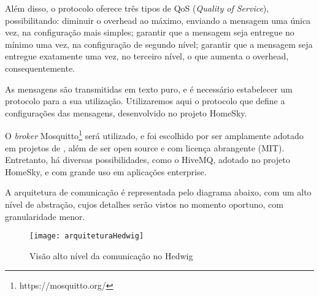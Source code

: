 Além disso, o protocolo \wmqtt{} oferece três tipos de QoS (\textit{Quality of Service}), possibilitando: diminuir o overhead ao máximo, enviando a mensagem uma única vez, na configuração mais simples; garantir que a mensagem seja entregue no mínimo uma vez, na configuração de segundo nível; garantir que a mensagem seja entregue exatamente uma vez, no terceiro nível, o que aumenta o overhead, consequentemente.

As mensagens são transmitidas em texto puro, e é necessário estabelecer um protocolo para a sua utilização. Utilizaremos aqui o protocolo que define a configurações das mensagens, desenvolvido no projeto HomeSky.

O \textit{broker} Mosquitto\footnote{https://mosquitto.org/} será utilizado, e foi escolhido por ser amplamente adotado em projetos de \wiot{}, além de ser open source e com licença abrangente (MIT). Entretanto, há diversas possibilidades, como o HiveMQ, adotado no projeto HomeSky, e com grande uso em aplicações enterprise.

A arquitetura de comunicação é representada pelo diagrama abaixo, com um alto nível de abstração, cujos detalhes serão vistos no momento oportuno, com granularidade menor.

\begin{figure}[H]
	\centering
	\caption{Visão alto nível da comunicação no Hedwig}
  \texttt{[image: arquiteturaHedwig]}
\label{fig:diagramaComunicacao}
\end{figure}

